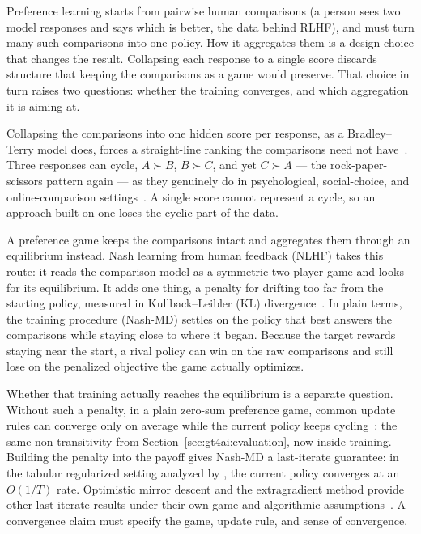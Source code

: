 Preference learning starts from pairwise human comparisons (a person sees two model responses and
says which is better, the data behind RLHF), and must turn many such
comparisons into one policy. How it aggregates them is a design choice that changes the result. Collapsing
each response to a single score discards structure that keeping the
comparisons as a game would preserve. That choice in turn raises two
questions: whether the training converges, and which aggregation it is aiming
at.

Collapsing the comparisons into one hidden score per response, as a Bradley--Terry
model does, forces a straight-line ranking the comparisons need not
have~\citep{BradleyTerry1952}. Three responses can cycle, $A \succ B$, $B \succ C$,
and yet $C \succ A$ --- the rock-paper-scissors pattern again --- as they genuinely do
in psychological, social-choice, and online-comparison
settings~\citep{May1954,Tversky1969,Dudik2015}. A single score cannot represent a
cycle, so an approach built on one loses the cyclic part of the data.

A preference game keeps the comparisons intact and aggregates them through an
equilibrium instead. Nash learning from human feedback (NLHF) takes this route: it reads the
comparison model as a symmetric two-player game and looks for its equilibrium.
It adds one thing, a penalty for drifting too far from the starting policy,
measured in Kullback--Leibler (KL) divergence~\citep{Munos2024}. In plain
terms, the training procedure (Nash-MD) settles on the policy that best answers the
comparisons while staying close to where it began. Because the target rewards staying
near the start, a rival policy can win on the raw comparisons and still lose on the
penalized objective the game actually optimizes.

Whether that training actually reaches the equilibrium is a separate question. Without
such a penalty, in a plain zero-sum
preference game, common update rules can converge only on average while the current policy keeps cycling~\citep{Mertikopoulos2018}: the same
non-transitivity from Section~\ref{sec:gt4ai:evaluation}, now inside training. Building the penalty into the
payoff gives Nash-MD a last-iterate guarantee: in the tabular regularized setting
analyzed by \citet{Munos2024}, the current policy converges at an $O(1/T)$ rate.
Optimistic mirror descent and the extragradient method provide other last-iterate
results under their own game and algorithmic assumptions~\citep{Mertikopoulos2019}.
A convergence claim must specify the game, update rule, and sense of convergence.


